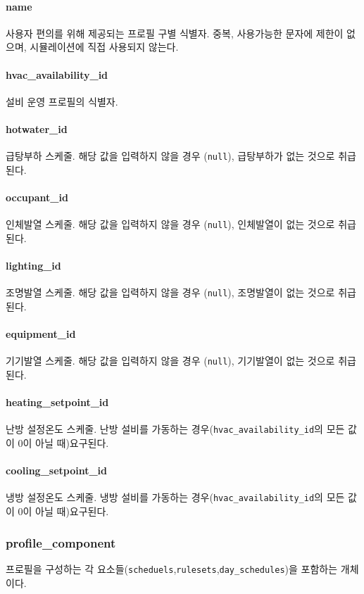 \paragraph{name} 사용자 편의를 위해 제공되는 프로필 구별 식별자. 중복, 사용가능한 문자에 제한이 없으며, 시뮬레이션에 직접 사용되지 않는다.

\paragraph{hvac\_availability\_id} 설비 운영 프로필의 식별자.

\paragraph{hotwater\_id} 급탕부하 스케줄. 해당 값을 입력하지 않을 경우 (\texttt{null}), 급탕부하가 없는 것으로 취급된다.

\paragraph{occupant\_id} 인체발열 스케줄. 해당 값을 입력하지 않을 경우 (\texttt{null}), 인체발열이 없는 것으로 취급된다.

\paragraph{lighting\_id} 조명발열 스케줄. 해당 값을 입력하지 않을 경우 (\texttt{null}), 조명발열이 없는 것으로 취급된다.

\paragraph{equipment\_id} 기기발열 스케줄. 해당 값을 입력하지 않을 경우 (\texttt{null}), 기기발열이 없는 것으로 취급된다.

\paragraph{heating\_setpoint\_id} 난방 설정온도 스케줄. 난방 설비를 가동하는 경우(\texttt{hvac\_availability\_id}의 모든 값이 0이 아닐 때)요구된다.

\paragraph{cooling\_setpoint\_id} 냉방 설정온도 스케줄. 냉방 설비를 가동하는 경우(\texttt{hvac\_availability\_id}의 모든 값이 0이 아닐 때)요구된다.

\subsubsection{profile\_component} \label{subsubsection:ioref:profile_component}
프로필을 구성하는 각 요소들(\texttt{scheduels},\texttt{rulesets},\texttt{day\_schedules})을 포함하는 개체이다.

